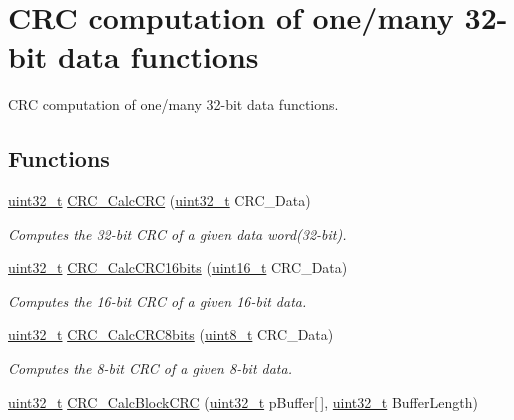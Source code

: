 \hypertarget{group___c_r_c___group2}{\section{C\-R\-C computation of one/many 32-\/bit data functions}
\label{group___c_r_c___group2}
}


C\-R\-C computation of one/many 32-\/bit data functions.  


\subsection*{Functions}
\begin{DoxyCompactItemize}
\item 
\hyperlink{stdint_8h_a435d1572bf3f880d55459d9805097f62}{uint32\-\_\-t} \hyperlink{group___c_r_c___group2_ga8149f957ccac8002065e6cad1b942835}{C\-R\-C\-\_\-\-Calc\-C\-R\-C} (\hyperlink{stdint_8h_a435d1572bf3f880d55459d9805097f62}{uint32\-\_\-t} C\-R\-C\-\_\-\-Data)
\begin{DoxyCompactList}\small\item\em Computes the 32-\/bit C\-R\-C of a given data word(32-\/bit). \end{DoxyCompactList}\item 
\hyperlink{stdint_8h_a435d1572bf3f880d55459d9805097f62}{uint32\-\_\-t} \hyperlink{group___c_r_c___group2_gafad8d1d777f5a8c5bf69edb91061eca0}{C\-R\-C\-\_\-\-Calc\-C\-R\-C16bits} (\hyperlink{stdint_8h_a273cf69d639a59973b6019625df33e30}{uint16\-\_\-t} C\-R\-C\-\_\-\-Data)
\begin{DoxyCompactList}\small\item\em Computes the 16-\/bit C\-R\-C of a given 16-\/bit data. \end{DoxyCompactList}\item 
\hyperlink{stdint_8h_a435d1572bf3f880d55459d9805097f62}{uint32\-\_\-t} \hyperlink{group___c_r_c___group2_ga77d51a1d532583e6a8b3cd761700976a}{C\-R\-C\-\_\-\-Calc\-C\-R\-C8bits} (\hyperlink{stdint_8h_aba7bc1797add20fe3efdf37ced1182c5}{uint8\-\_\-t} C\-R\-C\-\_\-\-Data)
\begin{DoxyCompactList}\small\item\em Computes the 8-\/bit C\-R\-C of a given 8-\/bit data. \end{DoxyCompactList}\item 
\hyperlink{stdint_8h_a435d1572bf3f880d55459d9805097f62}{uint32\-\_\-t} \hyperlink{group___c_r_c___group2_gab15ebf620615c360048fb4f45b15fae6}{C\-R\-C\-\_\-\-Calc\-Block\-C\-R\-C} (\hyperlink{stdint_8h_a435d1572bf3f880d55459d9805097f62}{uint32\-\_\-t} p\-Buffer\mbox{[}$\,$\mbox{]}, \hyperlink{stdint_8h_a435d1572bf3f880d55459d9805097f62}{uint32\-\_\-t} Buffer\-Length)

\end{DoxyCompactItemize}
